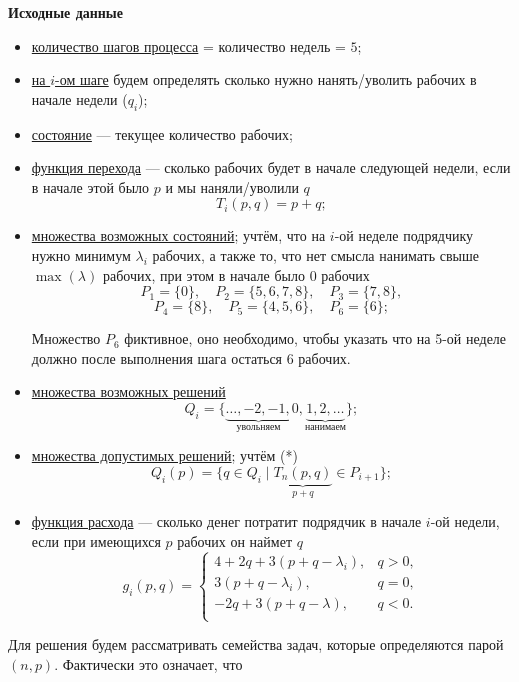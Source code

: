 \textbf{Исходные данные}
\begin{itemize}[nosep]
	\item \underline{количество шагов процесса} = количество недель = $5$;
	
	\item \underline{на $i$-ом шаге} будем определять сколько нужно нанять/уволить рабочих в начале недели ($q_i$);
	
	\item \underline{состояние} --- текущее количество рабочих;
	
	\item \underline{функция перехода} --- сколько рабочих будет в начале следующей недели, если в начале этой было $p$ и мы наняли/уволили $q$
	\[T_i(p, q) = p + q;\]
	
	\item \underline{множества возможных состояний}; учтём, что на $i$-ой неделе подрядчику нужно минимум $\lambda_i$ рабочих, а также то, что нет смысла нанимать свыше $\max (\lambda)$ рабочих, при этом в начале было 0 рабочих
	\[
	P_1 = \{0\}, \quad P_2 = \{5, 6, 7, 8\}, \quad P_3 = \{7, 8\},
	\]
	\[
	P_4 = \{8\}, \quad P_5 = \{4, 5, 6\}, \quad P_6 = \{6\};
	\]
	
	Множество $P_6$ фиктивное, оно необходимо, чтобы указать что на 5-ой неделе должно после выполнения шага остаться 6 рабочих.
	
	\item \underline{множества возможных решений}
	\[
	Q_i = \{\underbrace{\dots, -2, -1,}_{\text{увольняем}} 0, \underbrace{1, 2, \dots}_{\text{нанимаем}}\};
	\]
	
	\item \underline{множества допустимых решений}; учтём (*)
	\[Q_i(p) = \{q \in Q_i \; \big| \; \underbrace{T_n(p, q)}_{p + q} \in P_{i + 1} \};\]
	
	\item \underline{функция расхода} --- сколько денег потратит подрядчик в начале $i$-ой недели, если при имеющихся $p$ рабочих он наймет $q$
	\[g_i(p,q) = \begin{cases}
		4 + 2q + 3(p + q - \lambda_i),& q > 0, \\
		3(p + q - \lambda_i),& q = 0, \\
		-2q + 3(p + q - \lambda),& q < 0. \\
	\end{cases}\]
\end{itemize}

Для решения будем рассматривать семейства задач, которые определяются парой $(n, p)$. Фактически это означает, что

